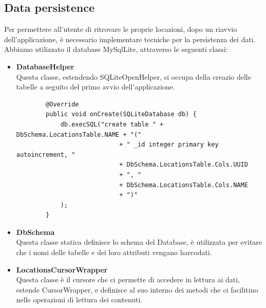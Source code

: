 \documentclass{article}
\begin{document}
\subsection{Data persistence}
Per permettere all'utente di ritrovare le proprie locazioni, dopo un riavvio dell'applicazione, è necessario implementare tecniche per la persistenza dei dati.
Abbiamo utilizzato il database MySqlLite, attraverso le seguenti classi:
\begin{itemize}
    \item \textbf{DatabaseHelper}\\ Questa classe, estendendo SQLiteOpenHelper, si occupa della creazio delle tabelle a seguito del primo avvio dell'applicazione.
    \begin{lstlisting}
        @Override
        public void onCreate(SQLiteDatabase db) {
            db.execSQL("create table " + DbSchema.LocationsTable.NAME + "("
                            + " _id integer primary key autoincrement, "
                            + DbSchema.LocationsTable.Cols.UUID
                            + ", "
                            + DbSchema.LocationsTable.Cols.NAME
                            + ")"
            );
        }
    \end{lstlisting}
    \item \textbf{DbSchema}\\ Questa classe statica definisce lo schema del Database, è utilizzata per evitare che i nomi delle tabelle e dei
    loro attributi vengano harcodati.
    \item \textbf{LocationsCursorWrapper}\\ Questa classe è il cursore che ci permette di accedere in lettura ai dati, estende CursorWrapper, e definisce
    al suo interno dei metodi che ci facilitino nelle operazioni di lettura dei contenuti.
\end{itemize}
\end{document}
